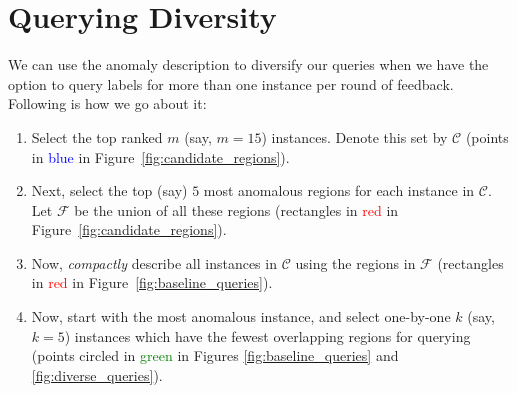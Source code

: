 \documentclass{article} %
\begin{document}
\section{Querying Diversity}
We can use the anomaly description to diversify our queries when we have the option to query labels for more than one instance per round of feedback. Following is how we go about it:
\begin{enumerate}
	\item Select the top ranked $m$ (say, $m=15$) instances. Denote this set by $\mathcal{C}$ (points in \textcolor{blue}{blue} in Figure~\ref{fig:candidate_regions}).
	\item Next, select the top (say) $5$ most anomalous regions for each instance in $\mathcal{C}$. Let $\mathcal{F}$ be the union of all these regions (rectangles in \textcolor{red}{red} in Figure~\ref{fig:candidate_regions}).
	\item Now, \emph{compactly} describe all instances in $\mathcal{C}$ using the regions in $\mathcal{F}$ (rectangles in \textcolor{red}{red} in Figure~\ref{fig:baseline_queries}).
	\item Now, start with the most anomalous instance, and select one-by-one $k$ (say, $k=5$) instances which have the fewest overlapping regions for querying (points circled in \textcolor{green}{green} in Figures \ref{fig:baseline_queries} and \ref{fig:diverse_queries}).
\end{enumerate}
\end{document}

